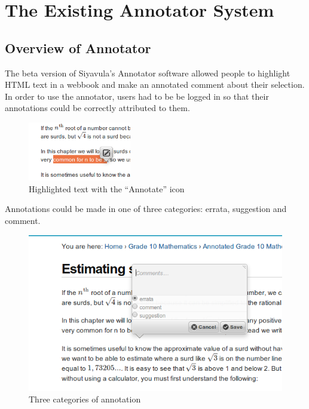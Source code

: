 
\chapter{The Existing Annotator System} %

\label{Chapter2} %



\section{Overview of Annotator}
The beta version of Siyavula's Annotator software allowed people to highlight HTML text in a webbook and make an annotated comment about their selection. In order to use the annotator, users had to be be logged in so that their annotations could be correctly attributed to them. 

\begin{figure}[h]
    \centering
    \includegraphics[width=0.4\textwidth]{Figures/annotator1.png}
 \caption{Highlighted text with the ``Annotate'' icon}
\end{figure}

Annotations could be made in one of three categories: errata, suggestion and comment.
\begin{figure}[h]
    \centering
    \includegraphics[width=\textwidth]{Figures/annotatorcategories.png}
 \caption{Three categories of annotation}
\end{figure}


